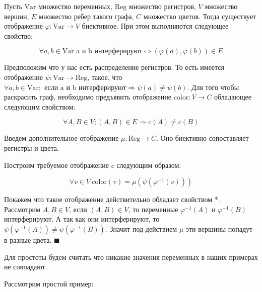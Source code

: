 \documentclass[12pt]{article}
\begin{document}
Пусть $\text{Var}$ множество переменных, $\text{Reg}$ множество регистров, $V$ множество вершин, $E$
множество ребер такого графа, $C$ множество цветов. 
Тогда существует отображение $\varphi : \text{Var} \to V$ биективное. При этом выполняются следующее свойство:

$$\forall a, b \in \text{Var} \text{ a и b интерферируют}  \Leftrightarrow (\varphi(a), \varphi(b)) \in E$$

Предположим что у нас есть распределение регистров. То есть имеется отображение $\psi : \text{Var} \to \text{Reg}$,
такое, что $\forall a, b \in \text{Var}; \text{ если a и b интерферируют} \Rightarrow \psi(a) \neq \psi(b)$.
Для того чтобы раскрасить граф, необходимо предъявить отображение $\text{color}: V \to C$ обладающее следующим свойством:

\begin{equation}
\forall A, B \in V; (A, B) \in E \Rightarrow c(A) \neq c(B) \tag{*}
\end{equation}

Введем дополнительное отображение $\mu : \text{Reg} \to C$. Оно биективно сопоставляет регистры и цвета.

Построим требуемое отображение $c$ следующим образом:

\begin{equation*}
\forall v \in V \medspace \text{color} (v) = \mu ( \psi  ( \varphi ^ {-1}( v ) ) )
\end{equation*}

Покажем что такое отображение действительно обладает свойством *. Рассмотрим $A, B \in V$, если $(A, B) \in V$,
то переменные $\varphi ^ {-1} ( A )$ и $\varphi ^ {-1} ( B )$ интерферируют. А так как они интерферируют, то
$\psi ( \varphi ^ {-1} ( A ) ) \neq \psi ( \varphi ^ {-1} ( B ) )$. Значит под действием $\mu$ эти вершины
попадут в разные цвета. \hfill $\blacksquare$



Для простоты будем считать что никакие значения переменных в наших примерах не совпадают.

Рассмотрим простой пример:
\end{document}
